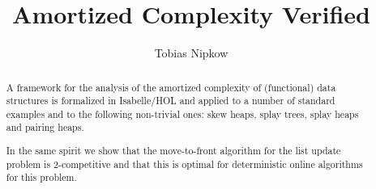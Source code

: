 \documentclass[11pt,a4paper]{article}
\begin{document}
\title{Amortized Complexity Verified}
\author{Tobias Nipkow}
\maketitle

\begin{abstract}
  A framework for the analysis of the amortized complexity of (functional)
  data structures is formalized in Isabelle/HOL and applied to a number of
  standard examples and to the following non-trivial ones: skew heaps,
  splay trees, splay heaps and pairing heaps.

  In the same spirit we show that the move-to-front algorithm for the list
  update problem is 2-competitive and that this is optimal for deterministic
  online algorithms for this problem.
\end{abstract}

\setcounter{tocdepth}{2}
\tableofcontents
\newpage





\end{document}

